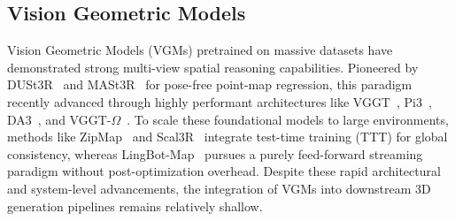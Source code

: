 \documentclass[letterpaper]{article} %
\begin{document}

\subsection{Vision Geometric Models}
Vision Geometric Models (VGMs) pretrained on massive datasets have demonstrated strong multi-view spatial reasoning capabilities. Pioneered by DUSt3R~\cite{wang2024dust3r} and MASt3R~\cite{leroy2024mast3r} for pose-free point-map regression, this paradigm recently advanced through highly performant architectures like VGGT~\cite{wang2025vggt}, Pi3~\cite{wang2025pi3}, DA3~\cite{lin2025da3}, and VGGT-$\Omega$~\cite{wang2026vggtomega}. To scale these foundational models to large environments, methods like ZipMap~\cite{jin2026zipmap} and Scal3R~\cite{xie2026scal3r} integrate test-time training (TTT) for global consistency, whereas LingBot-Map~\cite{chen2026lingbot-map} pursues a purely feed-forward streaming paradigm without post-optimization overhead. Despite these rapid architectural and system-level advancements, the integration of VGMs into downstream 3D generation pipelines remains relatively shallow.
\end{document}
